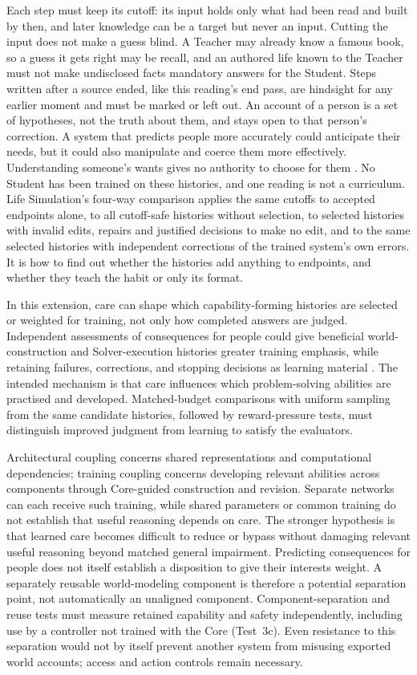 \documentclass[11pt]{article}
\begin{document}
Each step must keep its cutoff: its input holds only what had been read and built
by then, and later knowledge can be a target but never an input. Cutting the input
does not make a guess blind. A Teacher may already know a famous book, so a guess
it gets right may be recall, and an authored life known to the Teacher must not
make undisclosed facts mandatory answers for the Student. Steps written after a
source ended, like this reading's end pass, are hindsight for any earlier moment
and must be marked or left out. An account of a person is a set of hypotheses,
not the truth about them, and stays open to that person's correction. A system
that predicts people more accurately could anticipate their needs, but it could
also manipulate and coerce them more effectively. Understanding someone's wants
gives no authority to choose for them
\cite{westerbergLifeSimulation2026}. No Student has been trained on these
histories, and one reading is not a curriculum. Life Simulation's four-way
comparison applies the same cutoffs to accepted endpoints alone, to all
cutoff-safe histories without selection, to selected histories with invalid edits,
repairs and justified decisions to make no edit, and to the same selected histories
with independent corrections of the trained system's own errors. It is how to find
out whether the histories add anything to endpoints, and whether they teach the
habit or only its format.

In this extension, care can shape which capability-forming histories are
selected or weighted for training, not only how completed answers are judged.
Independent assessments of consequences for people could give beneficial
world-construction and Solver-execution histories greater training emphasis,
while retaining failures, corrections, and stopping decisions as learning
material \cite{westerbergLifeSimulation2026,westerberg2026fractal}.
The intended mechanism is that care influences which problem-solving abilities
are practised and developed. Matched-budget comparisons with uniform sampling
from the same candidate histories, followed by reward-pressure tests, must
distinguish improved judgment from learning to satisfy the evaluators.

Architectural coupling concerns shared representations and computational
dependencies; training coupling concerns developing relevant abilities across
components through Core-guided construction and revision. Separate networks
can each receive such training, while shared parameters or common training do
not establish that useful reasoning depends on care. The stronger hypothesis
is that learned care becomes difficult to reduce or bypass without damaging
relevant useful reasoning beyond matched general impairment. Predicting
consequences for people does not itself establish a disposition to give their
interests weight. A separately reusable world-modeling component is therefore a
potential separation point, not automatically an unaligned component.
Component-separation and reuse tests must measure retained capability and
safety independently, including use by a controller not trained with the Core
(Test~3c). Even resistance to this separation would not by itself prevent
another system from misusing exported world accounts; access and action
controls remain necessary.
\end{document}
